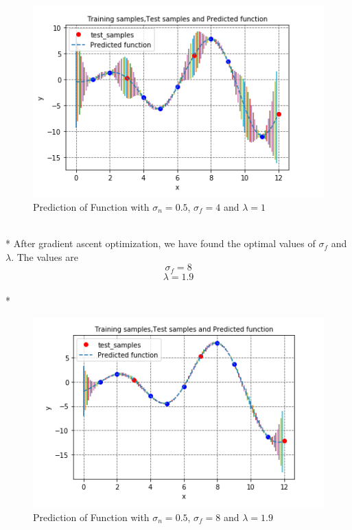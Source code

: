 \documentclass{article}
\begin{document}
\begin{figure}[]
    \centering
    \includegraphics[width=12cm]{Capture4.PNG}
    \caption{Prediction of Function with $\sigma_n = 0.5$, $\sigma_f=4$ and $\lambda=1$}
    \label{fig:Function prediction2}
\end{figure}
\\*
After gradient ascent optimization, we have found the optimal values of $\sigma_f$ and $\lambda$. The values are
$$\sigma_f=8$$ 
$$\lambda=1.9$$
\\*
\begin{figure}[]
    \centering
    \includegraphics[width=12cm]{Capture5.PNG}
    \caption{Prediction of Function with $\sigma_n = 0.5$, $\sigma_f=8$ and $\lambda=1.9$}
    \label{fig:Function prediction3}
\end{figure}
\end{document}
